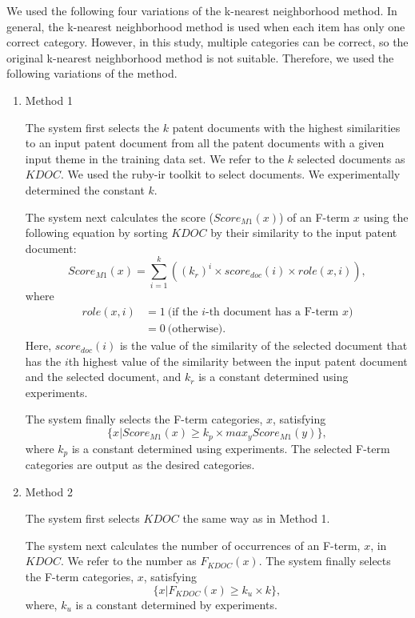 \documentclass[english]{jnlp_1.2c}
\begin{document}
We used the following four variations of the k-nearest neighborhood method. 
In general, 
the k-nearest neighborhood method is used 
when each item has only one correct category. 
However, in this study, 
multiple categories can be correct, so
the original k-nearest neighborhood method is not suitable.
Therefore, we used the following 
variations of the method.
\begin{enumerate}
\item 
Method 1

The system first selects the
$k$ patent documents with the highest similarities 
to an input patent document 
from all the patent documents with a given input theme in the training data set.
We refer to the $k$ selected documents as $KDOC$. 
We used the ruby-ir toolkit \cite{ruby-ir-eng2_2,NLP2003_eng_2} to select documents.
We experimentally determined the constant $k$. 

The system next calculates the score ($Score_{M1}(x)$) of an F-term $x$ 
using the following equation by sorting $KDOC$ by
their similarity to the input patent document:
\begin{equation}
Score_{M1}(x) = \sum_{i=1}^{k} ((k_r)^i \times score_{doc}(i) \times role(x,i)),
\end{equation}
where
\begin{align*}
role(x,i) & = 1 \ \mbox{(if the $i$-th document has a F-term $x$)} \nonumber\\
          & = 0 \ \mbox{(otherwise)}. \nonumber
\end{align*}
Here, 
$score_{doc}(i)$ is the value of the similarity 
of the selected document that has the $i$th highest value of the similarity 
between the input patent document and the selected document, 
and $k_r$ is a constant 
determined using experiments.

The system finally selects the 
F-term categories, $x$, satisfying 
\begin{equation}
\{x| Score_{M1}(x) \geq k_p \times max_y Score_{M1}(y)\},
\end{equation}
where $k_p$ is a constant 
determined using experiments.
The selected F-term categories are 
output as the desired categories.

\item 
Method 2

The system first selects $KDOC$ the same way as in Method 1.

The system next calculates the number of occurrences
of an F-term, $x$, in $KDOC$. 
We refer to the number as $F_{KDOC}(x)$. 
The system finally selects the 
F-term categories, $x$, satisfying
\begin{equation}
\{x| F_{KDOC}(x) \geq k_u \times k\},
\end{equation}
where, $k_u$ is a constant determined by experiments.


\end{enumerate}
\end{document}

